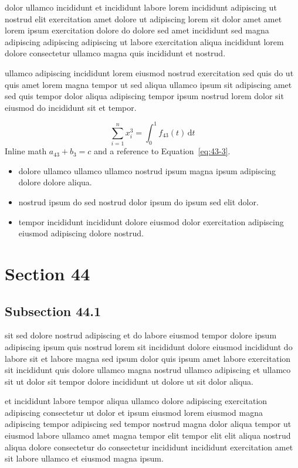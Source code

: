 \documentclass{article}
\begin{document}
dolor ullamco incididunt et incididunt labore lorem incididunt adipiscing ut nostrud elit exercitation amet dolore ut adipiscing lorem sit dolor amet amet lorem ipsum exercitation dolore do dolore sed amet incididunt sed magna adipiscing adipiscing adipiscing ut labore exercitation aliqua incididunt lorem dolore consectetur ullamco magna quis incididunt et nostrud.

ullamco adipiscing incididunt lorem eiusmod nostrud exercitation sed quis do ut quis amet lorem magna tempor ut sed aliqua ullamco ipsum sit adipiscing amet sed quis tempor dolor aliqua adipiscing tempor ipsum nostrud lorem dolor sit eiusmod do incididunt sit et tempor.

\begin{equation}\label{eq:43-3}
  \sum_{i=1}^{n} x_i^{3} = \int_0^1 f_{43}(t)\,\mathrm{d}t
\end{equation}
Inline math $a_{43} + b_{3} = c$ and a reference to Equation~\eqref{eq:43-3}.

\begin{itemize}
  \item dolore ullamco ullamco ullamco nostrud ipsum magna ipsum adipiscing dolore dolore aliqua.
  \item nostrud ipsum do sed nostrud dolor ipsum do ipsum sed elit dolor.
  \item tempor incididunt incididunt dolore eiusmod dolor exercitation adipiscing eiusmod adipiscing dolore nostrud.
\end{itemize}

\section{Section 44}\label{sec:44}
\subsection{Subsection 44.1}\label{sec:44-1}
sit sed dolore nostrud adipiscing et do labore eiusmod tempor dolore ipsum adipiscing ipsum quis nostrud lorem sit incididunt dolore eiusmod incididunt do labore sit et labore magna sed ipsum dolor quis ipsum amet labore exercitation sit incididunt quis dolore ullamco magna nostrud ullamco adipiscing et ullamco sit ut dolor sit tempor dolore incididunt ut dolore ut sit dolor aliqua.

et incididunt labore tempor aliqua ullamco dolore adipiscing exercitation adipiscing consectetur ut dolor et ipsum eiusmod lorem eiusmod magna adipiscing tempor adipiscing sed tempor nostrud magna dolor aliqua tempor ut eiusmod labore ullamco amet magna tempor elit tempor elit elit aliqua nostrud aliqua dolore consectetur do consectetur incididunt incididunt exercitation amet sit labore ullamco et eiusmod magna ipsum.
\end{document}
